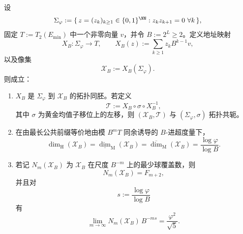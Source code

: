 \begin{theorem}\label{thm:xi-time-part62dgd-zg-address-golden-cantor-dimension}
设
\[
\Sigma_\varphi
:=
\{\,z=(z_k)_{k\ge 1}\in \{0,1\}^{\NN}: z_kz_{k+1}=0\ \forall k\,\},
\]
固定 \(T:=T_2(E_{\min})\) 中一个非零向量 \(v\)，并令 \(B:=2^L\ge 2\)。定义地址映射
\[
X_B:\Sigma_\varphi\longrightarrow T,
\qquad
X_B(z):=\sum_{k\ge 1}z_kB^{k-1}v,
\]
以及像集
\[
\mathcal X_B:=X_B(\Sigma_\varphi).
\]
则成立：
\begin{enumerate}
  \item \(X_B\) 是 \(\Sigma_\varphi\) 到 \(\mathcal X_B\) 的拓扑同胚。若定义
  \[
  \mathcal T:=X_B\circ \sigma\circ X_B^{-1},
  \]
  其中 \(\sigma\) 为黄金均值子移位上的左移，则 \((\mathcal X_B,\mathcal T)\) 与 \((\Sigma_\varphi,\sigma)\) 拓扑共轭。
  \item 在由最长公共前缀等价地由模 \(B^mT\) 同余诱导的 \(B\)-进超度量下，
  \[
  \dim_{\mathrm H}(\mathcal X_B)
  =
  \underline{\dim}_{\mathrm M}(\mathcal X_B)
  =
  \overline{\dim}_{\mathrm M}(\mathcal X_B)
  =
  \frac{\log\varphi}{\log B}.
  \]
  \item 若记 \(N_m(\mathcal X_B)\) 为 \(\mathcal X_B\) 在尺度 \(B^{-m}\) 上的最少球覆盖数，则
  \[
  N_m(\mathcal X_B)=F_{m+2},
  \]
  并且对
  \[
  s:=\frac{\log\varphi}{\log B}
  \]
  有
  \[
  \lim_{m\to\infty}N_m(\mathcal X_B)\,B^{-ms}
  =
  \frac{\varphi^2}{\sqrt5}.
  \]
\end{enumerate}
\end{theorem}
